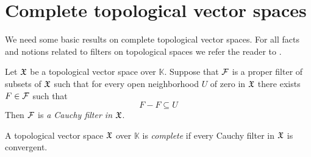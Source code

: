 \section{Complete topological vector spaces}
\noindent
We need some basic results on complete topological vector spaces. For all facts and notions related to filters on topological spaces we refer the reader to \cite{Filters_in_topology}.

\begin{definition}
Let ${\mathfrak X}$ be a topological vector space over $\mathbb{K}$. Suppose that ${\mathcal F}$ is a proper filter of subsets of ${\mathfrak X}$ such that for every open neighborhood $U$ of zero in ${\mathfrak X}$ there exists $F \in {\mathcal F}$ such that
$$F - F \subseteq U$$
Then ${\mathcal F}$ is \textit{a Cauchy filter in ${\mathfrak X}$}.
\end{definition}

\begin{definition}
A topological vector space ${\mathfrak X}$ over $\mathbb{K}$ is \textit{complete} if every Cauchy filter in ${\mathfrak X}$ is convergent.
\end{definition}

